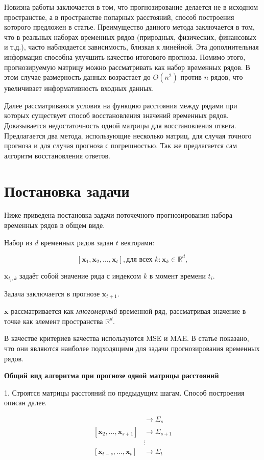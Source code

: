 \documentclass{article}
\begin{document}
	Новизна работы заключается в том, что прогнозирование делается не в исходном пространстве, а в пространстве попарных расстояний, способ построения которого предложен в статье. Преимущество данного метода заключается в том, что в реальных наборах временных рядов (природных, физических, финансовых и т.д.), часто наблюдается зависимость, близкая к линейной. Эта дополнительная информация способна улучшить качество итогового прогноза. Помимо этого, прогнозируемую матрицу можно рассматривать как набор временных рядов. В этом случае размерность данных возрастает до $O(n^2)$ против $n$ рядов, что увеличивает информативность входных данных.
	
	Далее рассматриваюся условия на функцию расстояния между рядами при которых существует способ восстановления значений временных рядов. Доказывается недостаточность одной матрицы для восстановления ответа. Предлагается два метода, использующие несколько матриц, для случая точного прогноза и для случая прогноза с погрешностью. Так же предлагается сам алгоритм восстановления ответов.

\section{Постановка задачи}

Ниже приведена постановка задачи поточечного прогнозирования набора временных рядов в общем виде.

Набор из $d$ временных рядов задан $t$ векторами:

$$[\mathbf{x}_1, \mathbf{x}_2, \ldots, \mathbf{x}_t], \text{для всех } k: \mathbf{x}_k \in \mathbb{R}^d, $$

$\mathbf{x}_{t_i, k}$ задаёт собой значение ряда с индексом $k$ в момент времени $t_i$.

Задача заключается в прогнозе $\mathbf{x}_{t+1}$.

$\mathbf{x}$ рассматривается как \textit{многомерный} временной ряд, рассматривая значение в точке как элемент пространства $\mathbb{R}^d$.

В качестве критериев качества используются MSE и MAE. В статье \cite{jadon2022comprehensive} показано, что они являются наиболее подходящими для задачи прогнозирования временных рядов.

\textbf{Общий вид алгоритма при прогнозе одной матрицы расстояний}

1. Строятся матрицы расстояний по предыдущим шагам. Способ построения описан далее.

\begin{align*}
	[\mathbf{x}_1, \ldots, \mathbf{x}_s] &\rightarrow \Sigma_s \\
	[\mathbf{x}_2, \ldots, \mathbf{x}_{s+1}] &\rightarrow \Sigma_{s+1} \\
	&\vdots \\
	[\mathbf{x}_{t-s}, \ldots, \mathbf{x}_t] &\rightarrow \Sigma_{t}
\end{align*}
\end{document}
